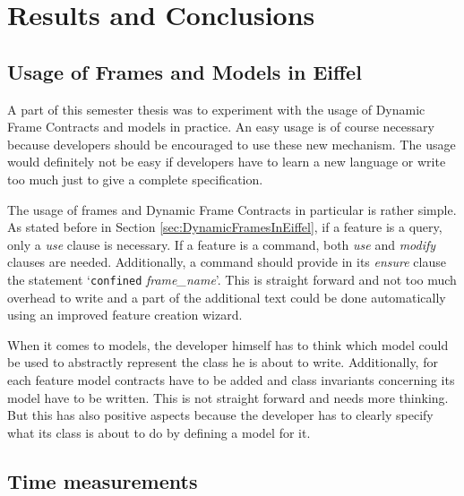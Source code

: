 \chapter{Results and Conclusions}
\label{sec:ResultsAndConclusions}

\section{Usage of Frames and Models in Eiffel}
\label{sec:UsageOfFramesAndModelsInEiffel}

A part of this semester thesis was to experiment with the usage of Dynamic Frame Contracts and models in practice. An easy usage is of course necessary because developers should be encouraged to use these new mechanism. The usage would definitely not be easy if developers have to learn a new language or write too much just to give a complete specification.

The usage of frames and Dynamic Frame Contracts in particular is rather simple. As stated before in Section \ref{sec:DynamicFramesInEiffel}, if a feature is a query, only a \emph{use} clause is necessary. If a feature is a command, both \emph{use} and \emph{modify} clauses are needed. Additionally, a command should provide in its \emph{ensure} clause the statement `\lstinline!confined! \emph{frame\_name}'. This is straight forward and not too much overhead to write and a part of the additional text could be done automatically using an improved feature creation wizard.

When it comes to models, the developer himself has to think which model could be used to abstractly represent the class he is about to write. Additionally, for each feature model contracts have to be added and class invariants concerning its model have to be written. This is not straight forward and needs more thinking. But this has also positive aspects because the developer has to clearly specify what its class is about to do by defining a model for it.

\section{Time measurements}
\label{sec:Measurements}

